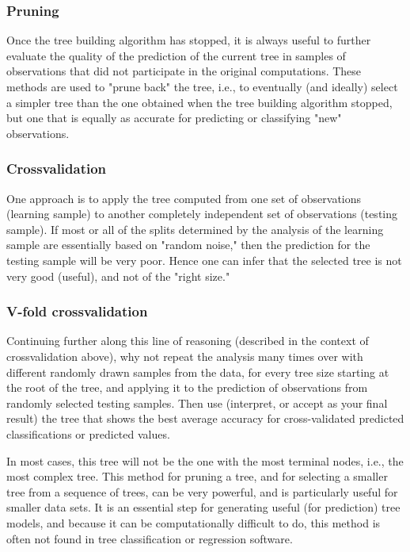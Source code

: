 \documentclass[caret-main.tex]{subfiles}
\begin{document}
\subsubsection{Pruning}
Once the tree building algorithm has stopped, it is always useful to further evaluate the quality of the prediction of the current tree in samples of observations that did not participate in the original computations. These methods are used to "prune back" the tree, i.e., to eventually (and ideally) select a simpler tree than the one obtained when the tree building algorithm stopped, but one that is equally as accurate for predicting or classifying "new" observations.

\subsubsection{Crossvalidation}
One approach is to apply the tree computed from one set of observations (learning sample) to another completely independent set of observations (testing sample). If most or all of the splits determined by the analysis of the learning sample are essentially based on "random noise," then the prediction for the testing sample will be very poor. Hence one can infer that the selected tree is not very good (useful), and not of the "right size."

\subsubsection{V-fold crossvalidation} 
Continuing further along this line of reasoning (described in the context of crossvalidation above), why not repeat the analysis many times over with different randomly drawn samples from the data, for every tree size starting at the root of the tree, and applying it to the prediction of observations from randomly selected testing samples. Then use (interpret, or accept as your final result) the tree that shows the best average accuracy for cross-validated predicted classifications or predicted values. 

In most cases, this tree will not be the one with the most terminal nodes, i.e., the most complex tree. This method for pruning a tree, and for selecting a smaller tree from a sequence of trees, can be very powerful, and is particularly useful for smaller data sets. It is an essential step for generating useful (for prediction) tree models, and because it can be computationally difficult to do, this method is often not found in tree classification or regression software.
\end{document}
